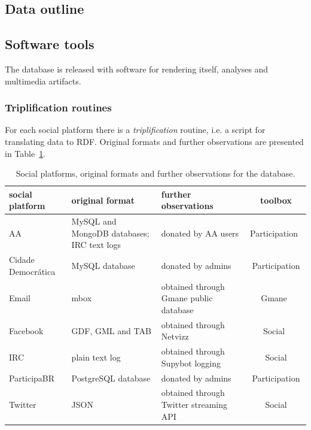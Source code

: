 \subsection{Data outline}




\subsection{Software tools}
The database is released with software for rendering itself, analyses and
multimedia artifacts.
\subsubsection{Triplification routines}
For each social platform there is a \emph{triplification} routine,
i.e. a script for translating data to RDF.
Original formats and further observations are presented in
Table~\ref{tab:provenance}.
\begin{table}[h!]\scriptsize
	\begin{center}
		\caption{Social platforms, original formats and further observations for
		the database.}\label{tab:provenance}
		\begin{tabular}{| l || p{3cm} | p{3cm} | c |}\hline
			\textbf{social platform} & \textbf{original format} & \textbf{further observations} & \textbf{toolbox} \\\hline\hline
				AA & MySQL and MongoDB databases; IRC text logs & donated by AA users & Participation~\cite{participation} \\\hline
				    Cidade Democrática & MySQL database & donated by admins & Participation \\\hline
					Email & mbox & obtained through Gmane public database & Gmane~\cite{gmane} \\\hline
					    Facebook & GDF, GML and TAB & obtained through Netvizz~\cite{netvizz} & Social~\cite{social} \\\hline
						IRC & plain text log & obtained through Supybot logging & Social \\\hline
						    ParticipaBR & PostgreSQL database & donated by admins & Participation \\\hline
							Twitter & JSON & obtained through Twitter streaming API & Social \\\hline
		\end{tabular}\end{center}
	\end{table}                    
